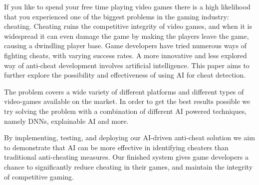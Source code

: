 \label{ch:abstract}

If you like to spend your free time playing video games there is a high likelihood that you
experienced one of the biggest problems in the gaming industry: cheating. Cheating ruins the
competitive integrity of video games, and when it is widespread it can even damage the game by
making the players leave the game, causing a dwindling player base. Game developers have
tried numerous ways of fighting cheats, with varying success rates. A more innovative and less
explored way of anti-cheat development involves artificial intelligence. This paper aims to further explore the possibility
and effectiveness of using AI for cheat detection.

The problem covers a wide variety of different platforms and different types of video-games available on the market.
In order to get the best results possible we try solving the problem with a combination of different AI powered techniques, namely DNNs, explainable AI and more.

By implementing, testing, and deploying our AI-driven anti-cheat solution we aim to
demonstrate that AI can be more effective in identifying cheaters than traditional anti-cheating
measures. Our finished system gives game developers a chance to significantly reduce cheating
in their games, and maintain the integrity of competitive gaming.
